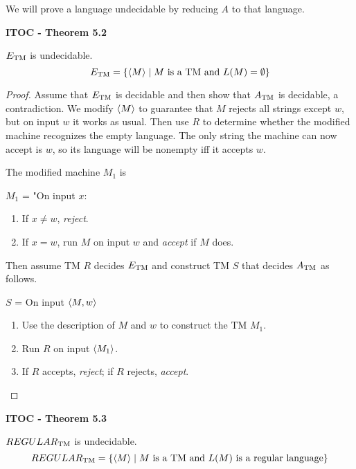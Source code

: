 We will prove a language undecidable by reducing $A$ to that language.

\label{lang:ETM_UDCDB}
\begin{shaded}
\textbf{ITOC - Theorem 5.2}

\medskip
$E_{\text{TM}}$ is undecidable.
\[
E_{\text{TM}} = \{ \langle{M}\rangle \mid M \text{ is a TM and } L(M) = \emptyset \}
\]
\end{shaded}

\begin{mdframed}
\begin{proof}
Assume that $E_{\text{TM}}$ is decidable and then show that $A_{\text{TM}}$ is decidable, a contradiction. We modify $\langle{M}\rangle$ to guarantee that $M$ rejects all strings except $w$, but on input $w$ it works as usual. Then use $R$ to determine whether the modified machine recognizes the empty language. The only string the machine can now accept is $w$, so its language will be nonempty iff it accepts $w$.

The modified machine $M_1$ is 

\medskip
$M_1$ = "On input $x$:
\begin{enumerate}
\item If $x \neq w$, \textit{reject}.
\item If $x = w$, run $M$ on input $w$ and \textit{accept} if $M$ does.
\end{enumerate}

Then assume TM $R$ decides $E_{\text{TM}}$ and construct TM $S$ that decides $A_{\text{TM}}$ as follows.

\medskip
$S$ = On input $\langle{M, w}\rangle$
\begin{enumerate}
\item Use the description of $M$ and $w$ to construct the TM $M_1$.
\item Run $R$ on input $\langle{M_1}\rangle$.
\item If $R$ accepts, \textit{reject}; if $R$ rejects, \textit{accept}. 
\end{enumerate}
\end{proof}
\end{mdframed}

\begin{shaded}
\textbf{ITOC - Theorem 5.3}

\label{lang:REGULARTM_UDCDB}
\medskip
$REGULAR_{\text{TM}}$ is undecidable.
\[
REGULAR_{\text{TM}} = \{\langle{M}\rangle \mid M \text{ is a TM and } L(M) \text{ is a regular language}\}
\]
\end{shaded}


